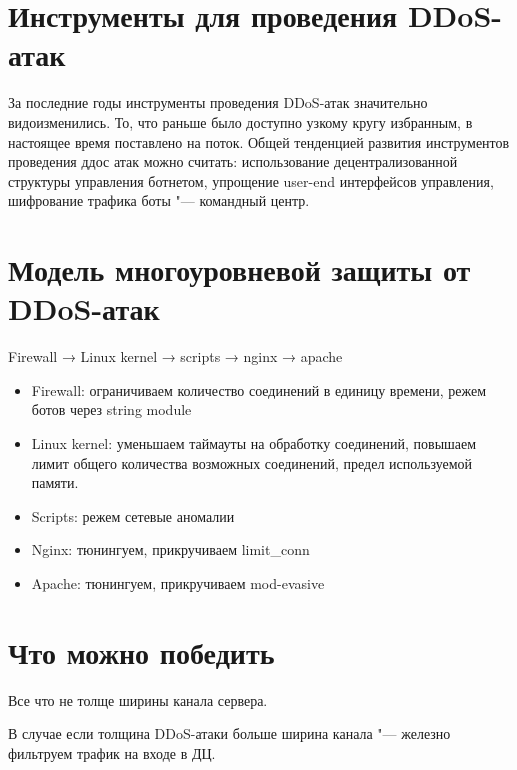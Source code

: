 \documentclass[10pt, a5paper]{article}
\begin{document}
\section*{Инструменты для проведения DDoS-атак}
За последние годы инструменты проведения DDoS-атак значительно видоизменились. То, что раньше было доступно узкому кругу избранным, в настоящее время поставлено на поток. Общей  тенденцией развития инструментов проведения ддос атак можно считать: использование децентрализованной структуры управления \linebreak ботнетом, упрощение user-end интерфейсов управления, шифрование трафика боты "--- командный центр.

\section*{Модель многоуровневой защиты от DDoS-атак}
Firewall → Linux kernel → scripts → nginx → apache
\begin{itemize}
\item Firewall: ограничиваем количество соединений в единицу времени, режем ботов через  string module
\item Linux kernel: уменьшаем таймауты на обработку соединений, повышаем лимит общего количества возможных соединений, предел используемой памяти.
\item Scripts: режем сетевые аномалии
\item Nginx: тюнингуем, прикручиваем  limit\_conn
\item Apache: тюнингуем, прикручиваем mod-evasive
\end{itemize}

\section*{Что можно победить}
Все что не толще ширины канала сервера.

В случае если толщина DDoS-атаки больше ширина канала "--- железно фильтруем трафик на входе в ДЦ.
\end{document}
